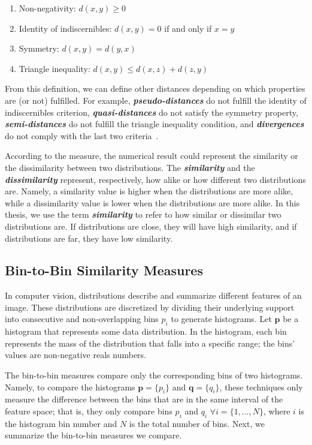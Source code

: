 \begin{enumerate}%
 \item Non-negativity: $d(x, y)\geq 0$
 \item Identity of indiscernibles: $d(x, y) = 0$ if and only if $x = y$
 \item Symmetry: $d(x, y) = d(y, x)$
 \item Triangle inequality: $d(x, y) \leq d(x, z) + d(z, y)$
\end{enumerate}

From this definition, we can define other distances depending on which properties are (or not) fulfilled. For example, \textbf{\textit{pseudo-distances}} do not fulfill the identity of indiscernibles criterion, \textbf{\textit{quasi-distances}} do not satisfy the symmetry property, \textbf{\textit{semi-distances}} do not fulfill the triangle inequality condition, and \textbf{\textit{divergences}} do not comply with the last two criteria~\citep{Khamsi:JFPTA:2015}.

According to the measure, the numerical result could represent the similarity or the dissimilarity between two distributions. The \textbf{\textit{similarity}} and the \textbf{\textit{dissimilarity}} represent, respectively, how alike or how different two distributions are. Namely, a similarity value is higher when the distributions are more alike, while a dissimilarity value is lower when the distributions are more alike. In this thesis, we use the term \textbf{\textit{similarity}} to refer to how similar or dissimilar two distributions are. If distributions are close, they will have high similarity, and if distributions are far, they have low similarity.
 
\subsection{Bin-to-Bin Similarity Measures}
In computer vision, distributions describe and summarize different features of an image. These distributions are discretized by dividing their underlying support into consecutive and non-overlapping bins $p_i$ to generate histograms. Let $\mathbf{p}$ be a histogram that represents some data distribution. In the histogram, each bin represents the mass of the distribution that falls into a specific range; the bins' values are non-negative reals numbers.

The bin-to-bin measures compare only the corresponding bins of two histograms. Namely, to compare the histograms  $\mathbf{p} = \{p_i\}$ and $\mathbf{q} = \{q_i\}$, these techniques only measure the difference between the bins that are in the same interval of the feature space; that is, they only compare bins  $p_i$ and $q_i$ $\forall i=\{1, \ldots, N\}$, where $i$ is the histogram bin number and $N$ is the total number of bins. Next, we summarize the bin-to-bin measures we compare.

